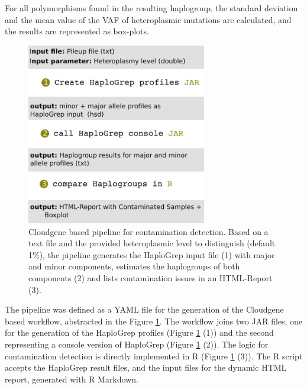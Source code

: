 For all polymorphisms found in the resulting haplogroup, the standard deviation and the mean value of the VAF of heteroplasmic mutations are calculated, and the results are represented as box-plots. 
\begin{figure}[!ht]
    \centering
    \includegraphics[width=0.7\textwidth]{images/workflow-haplochecker.png}
    \caption[Cloudgene pipeline for contamination detection]{Cloudgene based pipeline for contamination detection. Based on a text file and the provided heteroplasmic level to distinguish (default 1\%), the pipeline generates the HaploGrep input file (1) with major and minor components, estimates the haplogroups  of both components (2) and lists contamination issues in an HTML-Report (3).} 
    \label{cont:workflow}
\end{figure}

The pipeline was defined as a YAML file for the generation of the Cloudgene based workflow, abstracted in the Figure \ref{cont:workflow}. The workflow joins two JAR files, one for the generation of the HaploGrep profiles (Figure \ref{cont:workflow} (1)) and the second representing a console version of HaploGrep (Figure \ref{cont:workflow} (2)). The logic for contamination detection is directly implemented in R (Figure \ref{cont:workflow} (3)). The R script accepts the HaploGrep result files, and the input files for the dynamic HTML report, generated with R Markdown. 

